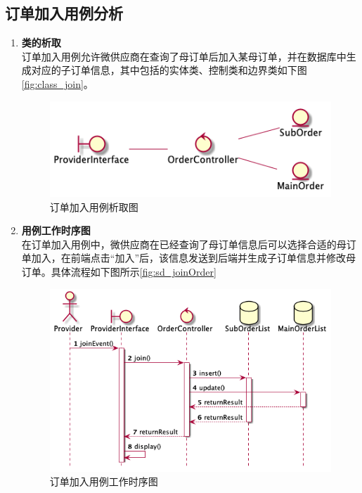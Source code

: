 \newpage
	\subsection{订单加入用例分析} %
	\label{sub:订单加入用例分析}
	\begin{enumerate}
		\item \textbf{类的析取} \\
		订单加入用例允许微供应商在查询了母订单后加入某母订单，并在数据库中生成对应的子订单信息，其中包括的实体类、控制类和边界类如下图
		\autoref{fig:class_join}。
		\begin{figure}[htp]
		    \centering
		    \includegraphics[width=12cm]{report/figure/classAnalyse/join.png}
		    \caption{订单加入用例析取图}
		    \label{fig:class_join}
		\end{figure}

		\item \textbf{用例工作时序图} \\
		在订单加入用例中，微供应商在已经查询了母订单信息后可以选择合适的母订单加入，在前端点击“加入”后，该信息发送到后端并生成子订单信息并修改母订单。具体流程如下图所示\autoref{fig:sd_joinOrder}

		\begin{figure}[htp]
		    \centering
		    \includegraphics[width=12cm]{report/figure/sequenceDiagram/sd_joinOrder.png}
		    \caption{订单加入用例工作时序图}
		    \label{fig:sd_joinOrder}
		\end{figure}
	\end{enumerate}
	
